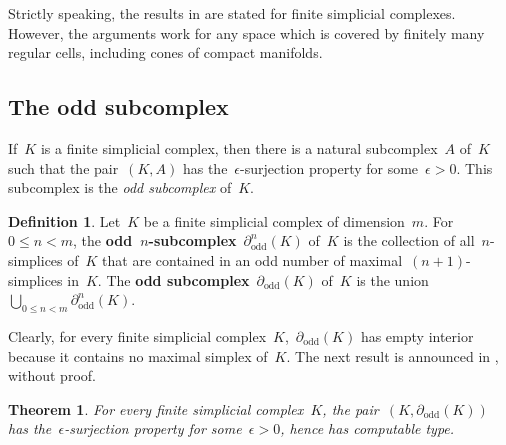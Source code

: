 \documentclass[english,11pt]{article}
\theoremstyle{plain}
\newtheorem{theorem}{Theorem}[section]
\theoremstyle{remark}
\theoremstyle{definition}
\newtheorem{definition}{Definition}[section]
\newcommand{\odd}[1]{\partial_\mathrm{odd}(#1)}
\newcommand{\oddn}[2]{\partial^{#1}_\mathrm{odd}(#2)}
\begin{document}
Strictly speaking, the results in \cite{AH22} are stated for finite simplicial complexes. However, the arguments work for any space which is covered by finitely many regular cells, including cones of compact manifolds.


\subsection{The odd subcomplex}
If~$K$ is a finite simplicial complex, then there is a natural subcomplex~$A$ of~$K$ such that the pair~$(K,A)$ has the~$\epsilon$-surjection property for some~$\epsilon>0$. This subcomplex is the \emph{odd subcomplex} of~$K$.

\begin{definition}
Let~$K$ be a finite simplicial complex of dimension~$m$. For~$0\leq n< m$,
the \textbf{odd~$n$-subcomplex}~$\oddn nK$ of~$K$ is the collection
of all~$n$-simplices of~$K$ that are contained in an odd number
of maximal~$(n+1)$-simplices in~$K$. The \textbf{odd subcomplex}~$\odd K$
of~$K$ is the union~$\bigcup_{0\leq n< m}\oddn nK$.
\end{definition}

Clearly, for every finite simplicial complex~$K$,~$\odd K$ has empty interior because it contains no maximal simplex of~$K$. The next result is announced in \cite{AH22}, without proof.

\begin{theorem}
\label{thm_odd}For every finite simplicial complex~$K$, the pair~$(K,\odd K)$ has the~$\epsilon$-surjection property for some~$\epsilon>0$, hence has computable type.
\end{theorem}
\end{document}
